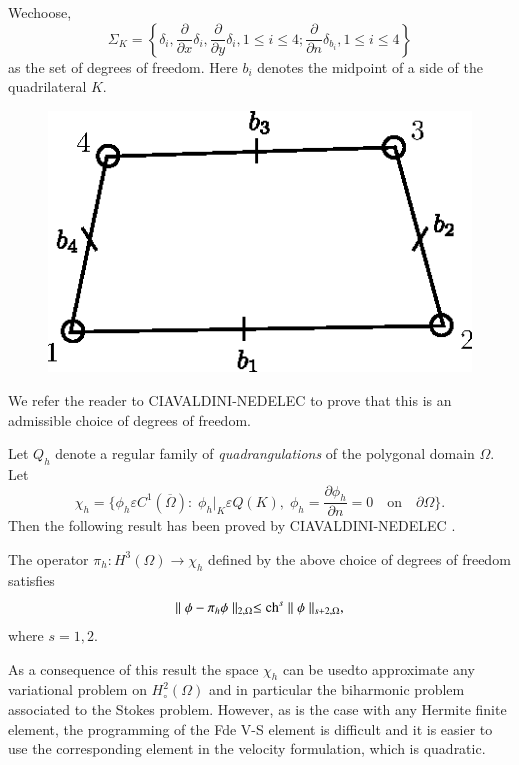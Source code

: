 We\pageoriginale choose,
$$
\Sigma_K=\left\{\delta_i,\frac{\partial}{\partial x}\delta_i,
\frac{\partial}{\partial y}\delta_i, 1\leq i\leq 4;\frac{\partial}
{\partial n}\delta_{b_i},1\leq i\leq 4\right\}
$$
as the set of degrees of freedom. Here $b_i$ denotes the midpoint of a
side of the quadrilateral $K$.
\begin{figure}[H]
\centering
\includegraphics{figure/fig6.5.eps}
\caption{}\label{fig6.5}
\end{figure}

We refer the reader to CIAVALDINI-NEDELEC \cite{key11} to prove that this is
an admissible choice of degrees of freedom.

Let $Q_h$ denote a regular family of \emph{quadrangulations} of the
polygonal domain $\Omega$. Let 
$$
\chi_h=\{\phi_h\varepsilon C^1(\overline{\Omega}):\;\phi_h|_K\varepsilon
Q(K),\;\phi_h=\frac{\partial\phi_h}{\partial n}=0\quad\text{on}\quad
\partial\Omega\}.
$$
Then the following result has been proved by CIAVALDINI-NEDELEC \cite{key11}. 

\setcounter{THM}{1}
\begin{THM}\label{chap6:THM2}
The operator $\pi_h:H^3(\Omega)\to\chi_h$ defined by the above choice
of degrees of freedom satisfies
$$
\parallel\phi -\pi_h\phi\parallel_{2,\Omega}\leq\operatorname{ch}^s\parallel\phi
\parallel_{s+2,\Omega}, 
$$
where $s=1, 2$.
\end{THM}

As a consequence of this result the space $\chi_h$ can be
used\pageoriginale to approximate any variational problem on
$H_\circ^2(\Omega)$ and in particular the biharmonic problem
associated to the Stokes problem. However, as is the case with any
Hermite finite element, the programming of the Fde V-S element is
difficult and it is easier to use the corresponding element in the
velocity formulation, which is quadratic.

